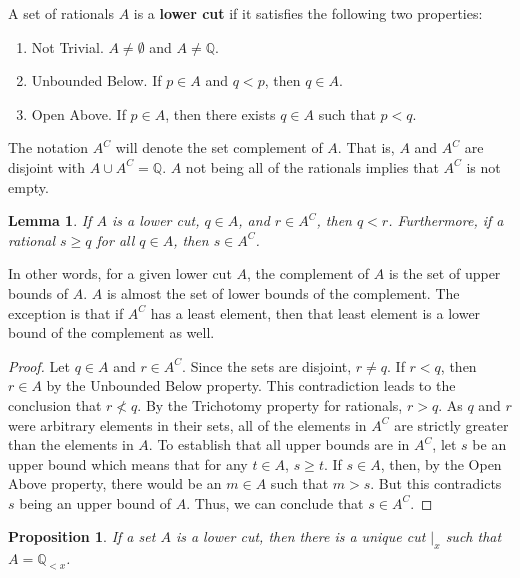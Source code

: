 \documentclass[12pt]{article}
\newtheorem{lemma}{Lemma}[section]
\newtheorem{proposition}{Proposition}[section]
\newcommand{\qcut}[2][x]{\ensuremath{\mathbb{Q}_{#2 #1}}}
\newcommand{\qlt}[1][x]{\qcut[#1]{<}}
\newcommand{\cut}[1][x]{{\vert}_{#1} }
\begin{document}
A set of rationals $A$ is a \textbf{lower cut} if it satisfies the following two properties: 
\begin{enumerate}
    \item Not Trivial. $A \neq \emptyset$ and $A \neq \mathbb{Q}$.
    \item Unbounded Below. If $p \in A$ and $q < p$, then $q \in A$. 
    \item Open Above. If $p \in A$, then there exists $q \in A$ such that $p < q$.
\end{enumerate}
The notation $A^C$ will denote the set complement of $A$. That is, $A$ and $A^C$ are disjoint with $A \cup A^C = \mathbb{Q}$. $A$ not being all of the rationals implies that $A^C$ is not empty. 

\begin{lemma}
    If $A$ is a lower cut, $q \in A$, and $r \in A^C$, then $q < r$. Furthermore, if a rational $s \geq q$ for all $q \in A$, then $s \in A^C$.
\end{lemma}

In other words, for a given lower cut $A$, the complement of $A$ is the set of upper bounds of $A$.  $A$ is almost the set of lower bounds of the complement. The exception is that if $A^C$ has a least element, then that least element is a lower bound of the complement as well. 

\begin{proof}
    Let $q \in A$ and $r \in A^C$. Since the sets are disjoint, $r \neq q$. If $r < q$, then $r \in A$ by the Unbounded Below property. This contradiction leads to the conclusion that $r \nless q$. By the Trichotomy property for rationals, $r > q$. As $q$ and $r$ were arbitrary elements in their sets, all of the elements in $A^C$ are strictly greater than the elements in $A$. To establish that all upper bounds are in $A^C$, let $s$ be an upper bound which means that for any $t \in A$, $s \geq t$. If $s \in A$, then, by the Open Above property, there would be an $m \in A$ such that $m > s$. But this contradicts $s$ being an upper bound of $A$. Thus, we can conclude that $s \in A^C$. 
\end{proof}


\begin{proposition}\label{br:lowcutdef}
    If a set $A$ is a lower cut, then there is a unique cut $\cut$ such that $A = \qlt$.
\end{proposition}
\end{document}
